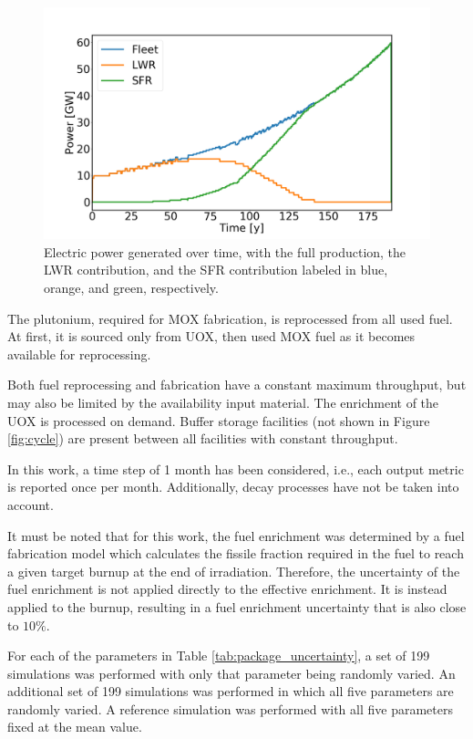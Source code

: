 \documentclass{anstrans}
\begin{document}
\begin{figure}[b] %
    \centering
    \includegraphics[scale=0.18]{power.png}
    \caption{Electric power generated over time, with the full production,
        the \gls{LWR} contribution, and the \gls{SFR} contribution labeled in blue, orange, and green, respectively.}
    \label{fig:power}
\end{figure}


The plutonium, required for \gls{MOX} fabrication, is reprocessed from all
used fuel.  At first, it is sourced only from \gls{UOX}, then used \gls{MOX} fuel
as it becomes available for reprocessing.

Both fuel reprocessing and fabrication have a constant maximum throughput, but may also be limited by the 
availability input material.  The enrichment of the \gls{UOX} is processed
on demand.  Buffer storage facilities (not shown in Figure \ref{fig:cycle}) are present
between all facilities with constant throughput.

In this work, a time step of 1 month has been considered, i.e., each output
metric is reported once per month. Additionally, decay processes have not be
taken into account.  

It must be noted that for this work, the fuel enrichment was determined by a
fuel fabrication model\cite{Leniau2015125} which
calculates the fissile fraction required in the fuel to reach a given target
burnup at the end of irradiation.  Therefore, the uncertainty of the fuel
enrichment is not applied directly to the effective enrichment. It is instead applied to the
burnup, resulting in a fuel enrichment uncertainty that is also close to
$10\%$.

For each of the parameters in Table \ref{tab:package_uncertainty}, a set of
199 simulations was performed with only that parameter being randomly varied.
An additional set of 199 simulations was performed in which all five
parameters are randomly varied.  A reference simulation was performed
with all five parameters fixed at the mean value.
\end{document}
